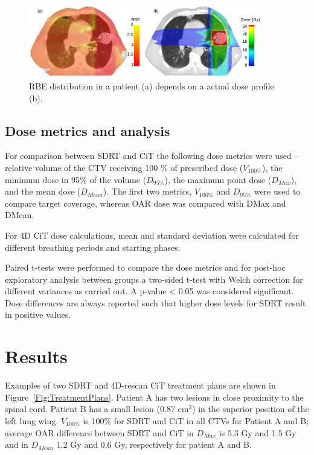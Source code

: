 \documentclass[type=dr, dr=rernat, acm$^3$entcolor=tud7b,colorbacktitle, bigchapter, openright, twoside, 12pt ]{tudthesis}
\begin{document}
\begin{figure}[H]
\begin{center}
\includegraphics[width=0.9\textwidth]{./Images/RBE.png}
\caption{RBE distribution in a patient (a) depends on a actual dose profile (b).}
\label{Fig:RBE}
\end{center}
\end{figure}

\subsection{Dose metrics and analysis}

For comparison between SDRT and CiT the following dose metrics were used – relative volume of the CTV receiving 100 \% of prescribed dose ($V_{100\%}$), 
the minimum dose in 95\% of the volume ($D_{95\%}$), the maximum point dose ($D_{Max}$), and the mean dose ($D_{Mean}$). The first two metrics, $V_{100\%}$ and $D_{95\%}$ were used 
to compare target coverage, whereas OAR dose was compared with DMax and DMean.

For 4D CiT dose calculations, mean and standard deviation were calculated for different breathing periods and starting phases.

Paired t-tests were performed to compare the dose metrics and for post-hoc exploratory analysis between groups a two-sided t-test with Welch correction for different variances
as carried out. A p-value < 0.05 was considered significant. Dose differences are always reported such that higher dose levels for SDRT result in positive values.

\section{Results}

Examples of two SDRT and 4D-rescan CiT treatment plans are shown in Figure~\ref{Fig:TreatmentPlans}. Patient A has two lesions in close proximity to the spinal cord. 
Patient B has a small lesion (0.87 cm$^3$) in the superior position of the left lung wing. $V_{100\%}$ is 100\% for SDRT and CiT in all CTVs for Patient A and B; 
average OAR difference between SDRT and CiT in $D_{Max}$ is 5.3 Gy and 1.5 Gy and in $D_{Mean}$ 1.2 Gy and 0.6 Gy, respectively for patient A and B.
\end{document}
